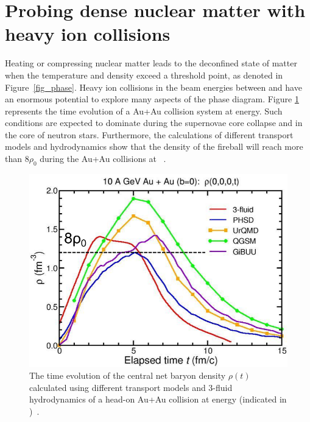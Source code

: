\section{Probing dense nuclear matter with heavy ion collisions}

Heating or compressing nuclear matter leads to the deconfined state of matter when the temperature and density exceed a threshold point, as denoted in Figure~\ref{fig_phase}. Heavy ion collisions in the beam energies between  and  have an enormous potential to explore many aspects of the phase diagram. Figure \ref{fig:cbm_density} represents the time evolution of a Au+Au collision system at  energy. Such conditions are expected to dominate during the supernovae core collapse and in the core of neutron stars. Furthermore, the calculations of different transport models and hydrodynamics show that the density of the fireball will reach more than $8\rho_{0}$ during the Au+Au collisions at ~\cite{CBM_physics}.
\newpage
\begin{figure}[!h]
    \centering
    \includegraphics[width=0.65\columnwidth]{Chapter1/images/CBM_density.png}
    \caption{The time evolution of the central net baryon density $\rho(t)$ calculated using different transport models and 3-fluid hydrodynamics of a head-on Au+Au collision at  energy (indicated in \agev{})~\cite{CBM_physics}.}
    \label{fig:cbm_density}
\end{figure}

